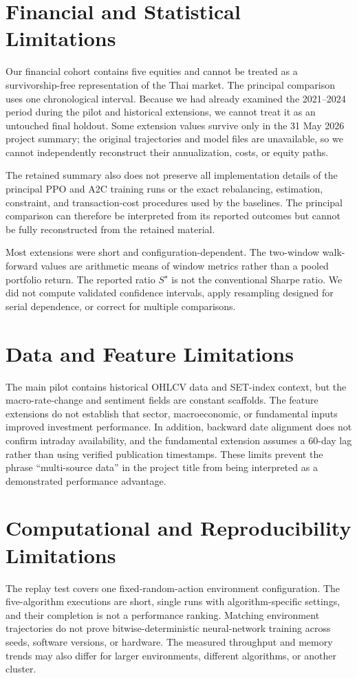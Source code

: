\documentclass[12pt,a4paper,oneside]{book}
\theoremstyle{plain}
\numberwithin{equation}{chapter} \DeclareMathOperator{\Var}{Var}
\begin{document}
\section{Financial and Statistical Limitations}
Our financial cohort contains five equities and cannot be treated as a survivorship-free representation of the Thai market. The principal comparison uses one chronological interval. Because we had already examined the 2021--2024 period during the pilot and historical extensions, we cannot treat it as an untouched final holdout. Some extension values survive only in the 31 May 2026 project summary; the original trajectories and model files are unavailable, so we cannot independently reconstruct their annualization, costs, or equity paths.

The retained summary also does not preserve all implementation details of the principal PPO and A2C training runs or the exact rebalancing, estimation, constraint, and transaction-cost procedures used by the baselines. The principal comparison can therefore be interpreted from its reported outcomes but cannot be fully reconstructed from the retained material.

Most extensions were short and configuration-dependent. The two-window walk-forward values are arithmetic means of window metrics rather than a pooled portfolio return. The reported ratio $S^\star$ is not the conventional Sharpe ratio. We did not compute validated confidence intervals, apply resampling designed for serial dependence, or correct for multiple comparisons.

\section{Data and Feature Limitations}
The main pilot contains historical OHLCV data and SET-index context, but the macro-rate-change and sentiment fields are constant scaffolds. The feature extensions do not establish that sector, macroeconomic, or fundamental inputs improved investment performance. In addition, backward date alignment does not confirm intraday availability, and the fundamental extension assumes a 60-day lag rather than using verified publication timestamps. These limits prevent the phrase ``multi-source data'' in the project title from being interpreted as a demonstrated performance advantage.

\section{Computational and Reproducibility Limitations}
The replay test covers one fixed-random-action environment configuration. The five-algorithm executions are short, single runs with algorithm-specific settings, and their completion is not a performance ranking. Matching environment trajectories do not prove bitwise-deterministic neural-network training across seeds, software versions, or hardware. The measured throughput and memory trends may also differ for larger environments, different algorithms, or another cluster.
\end{document}
